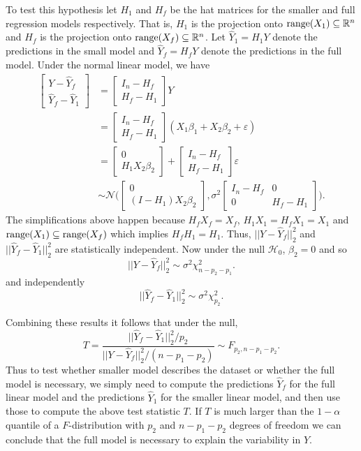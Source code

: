 To test this hypothesis let $H_1$ and $H_f$ be the hat matrices for the smaller and full regression models respectively. That is, $H_1$ is the projection onto $\mathrm{range}(X_1) \subseteq \mathbb{R}^n$ and $H_f$ is the projection onto $\mathrm{range}(X_f) \subseteq \mathbb{R}^n$. 
Let $\hat{Y}_1 = H_1 Y$ denote the predictions in the small model and $\hat{Y}_f =H_f Y$ denote the predictions in the full model. Under the normal linear model, we have
\begin{align*}
	 \begin{bmatrix} Y - \hat{Y}_f \\ \hat{Y}_f - \hat{Y}_1 \end{bmatrix} &= \begin{bmatrix} I_n -H_f \\ H_f - H_1 \end{bmatrix} Y\\
	 & =\begin{bmatrix} I_n -H_f \\ H_f - H_1 \end{bmatrix} (X_1 \beta_1 +X_2\beta_2+ \varepsilon) \\
	 &= \begin{bmatrix} 0 \\
	H_1X_2\beta_2 \end{bmatrix}+\begin{bmatrix} I_n -H_f \\ H_f - H_1 \end{bmatrix} \varepsilon\\ 
	 & \sim \mathcal{N} \Big(\begin{bmatrix} 0 \\
		(I-H_1)X_2\beta_2 \end{bmatrix},  \sigma^2 \begin{bmatrix} I_n - H_f & 0 \\ 0 & H_f - H_1 \end{bmatrix} \Big).
\end{align*}
The simplifications above happen because $H_fX_f=X_f$, $H_1X_1 = H_fX_1=X_1$ and $\mathrm{range}(X_1) \subseteq \mathrm{range}(X_f)$ which implies $H_f H_1=H_1$. Thus, $\vert \vert Y - \hat{Y}_f  \vert \vert_2^2$ and $\vert \vert \hat{Y}_f - \hat{Y}_1 \vert \vert_2^2$ are statistically independent. Now under the null $\mathcal{H}_0$, $\beta_2=0$ and so $$\vert \vert Y - \hat{Y}_f  \vert \vert_2^2 \sim \sigma^2 \chi_{n-p_2-p_1}^2.$$ and independently $$\vert \vert  \hat{Y}_f -\hat{Y}_1  \vert \vert_2^2 \sim \sigma^2 \chi_{p_2}^2.$$

Combining these results it follows that under the null, $$T= \frac{\vert \vert  \hat{Y}_f -\hat{Y}_1  \vert \vert_2^2/p_2}{\vert \vert Y - \hat{Y}_f  \vert \vert_2^2/(n-p_1-p_2)} \sim F_{p_2,n-p_1-p_2}.$$
Thus to test whether smaller model describes the dataset or whether the full model is necessary, we simply need to compute the predictions $\hat{Y}_f$ for the full linear model and the predictions $\hat{Y}_1$ for the smaller linear model, and then use those to compute the above test statistic $T$. If $T$ is much larger than the $1-\alpha$ quantile of a $F$-distribution with $p_2$ and $n-p_1-p_2$ degrees of freedom we can conclude that the full model is necessary to explain the variability in $Y$.

